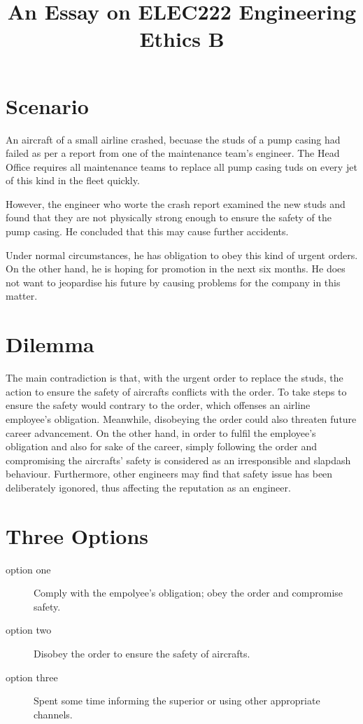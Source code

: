 \documentclass[12pt, a4paper]{article}
\title{An Essay on ELEC222 Engineering Ethics B}
\begin{document}
\maketitle
\tableofcontents

\section{Scenario}
An aircraft of a small airline crashed, becuase the studs of a pump casing had failed as per a report from one of the maintenance team's engineer. The Head Office requires all maintenance teams to replace all pump casing tuds on every jet of this kind in the fleet quickly.

However, the engineer who worte the crash report examined the new studs and found that they are not physically strong enough to ensure the safety of the pump casing. He concluded that this may cause further accidents.

Under normal circumstances, he has obligation to obey this kind of urgent orders. On the other hand, he is hoping for promotion in the next six months. He does not want to jeopardise his future by causing problems for the company in this matter.

\section{Dilemma}
The main contradiction is that, with the urgent order to replace the studs, the action to ensure the safety of aircrafts conflicts with the order. To take steps to ensure the safety would contrary to the order, which offenses an airline employee's obligation. Meanwhile, disobeying the order could also threaten future career advancement. On the other hand, in order to fulfil the employee's obligation and also for sake of the career, simply following the order and compromising the aircrafts' safety is considered as an irresponsible and slapdash behaviour. Furthermore, other engineers may find that safety issue has been deliberately igonored, thus affecting the reputation as an engineer.

\section{Three Options}
\begin{description}
  \item[option one] Comply with the empolyee's obligation; obey the order and compromise safety.
  \item[option two] Disobey the order to ensure the safety of aircrafts.
  \item[option three] Spent some time informing the superior or using other appropriate channels.
\end{description}
\end{document}
